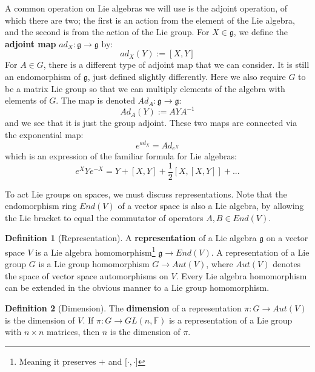 \documentclass[11pt, oneside]{article}   	%
\theoremstyle{definition}
\newtheorem{definition}{Definition}[section]
\begin{document}
A common operation on Lie algebras we will use is the adjoint operation, of which there are two; the 
first is an action from the element of the Lie algebra, and the second is from the action of the Lie group. 
For $X\in\mathfrak g$, we define the \textbf{adjoint map} $ad_X : \mathfrak g\rightarrow\mathfrak g$ by:
\begin{equation}
	ad_X(Y) := [X, Y]
\end{equation}
For $A\in G$, there is a different type of adjoint map that we can consider. It is still an endomorphism of 
$\mathfrak g$, just defined slightly differently. Here we also require $G$ to be a matrix Lie group so that 
we can multiply elements of the algebra with elements of $G$. The map is denoted $Ad_A : \mathfrak g
\rightarrow\mathfrak g$:
\begin{equation}
	Ad_A(Y) := AYA^{-1}
\end{equation}
and we see that it is just the group adjoint. These two maps are connected via the exponential map:
\begin{equation}
	e^{ad_X} = Ad_{e^{X}}
\end{equation}
which is an expression of the familiar formula for Lie algebras:
\begin{equation}
	e^{X} Y e^{-X} = Y + [X, Y] + \frac{1}{2}[X, [X, Y]] + ...
\end{equation}

To act Lie groups on spaces, we must discuss representations. Note that the endomorphism ring 
$End(V)$ of a vector space is also a Lie algebra, by allowing the Lie bracket to equal the commutator 
of operators $A, B\in End(V)$. 
\begin{definition}[Representation]
	A \textbf{representation} of a Lie algebra $\mathfrak g$ on a vector space $V$ is a Lie 
	algebra homomorphism\footnote{Meaning it preserves $+$ and $[\cdot, \cdot$]}  
	$\mathfrak g\rightarrow End(V)$. A representation of a Lie group $G$ is a Lie group 
	homomorphism $G\rightarrow Aut(V)$, where $Aut(V)$ denotes the space of vector space 
	automorphisms on $V$. Every Lie algebra homomorphism can be extended in the 
	obvious manner to a Lie group homomorphism.
\end{definition}

\begin{definition}[Dimension]
	The \textbf{dimension} of a representation $\pi : G\rightarrow Aut(V)$ is the dimension of $V$. 
	If $\pi : G\rightarrow GL(n, \mathbb F)$ is a representation of a Lie group with $n\times n$ matrices, 
	then $n$ is the dimension of $\pi$. 
\end{definition}
\end{document}
